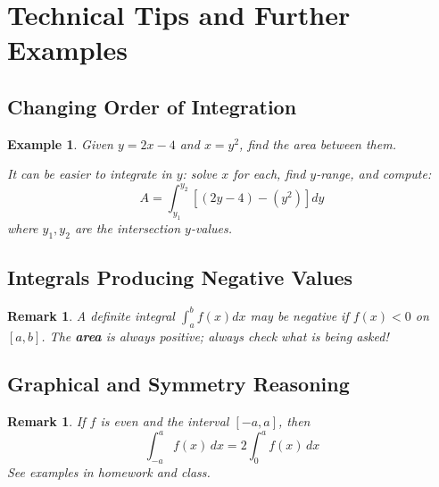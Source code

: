\documentclass[12pt]{article}
\newtheorem{example}[definition]{Example}
\newtheorem{remark}[definition]{Remark}
\begin{document}
\section{Technical Tips and Further Examples}

\subsection{Changing Order of Integration}

\begin{example}
Given $y = 2x-4$ and $x = y^2$, find the area between them.

It can be easier to integrate in $y$: solve $x$ for each, find $y$-range, and compute:
\[
A = \int_{y_1}^{y_2} \left[ (2y-4) - (y^2) \right] dy
\]
where $y_1,y_2$ are the intersection $y$-values.
\end{example}

\subsection{Integrals Producing Negative Values}

\begin{remark}
A definite integral $\int_a^b f(x)dx$ may be negative if $f(x)<0$ on $[a,b]$. The \textbf{area} is always positive; always check what is being asked!
\end{remark}

\subsection{Graphical and Symmetry Reasoning}

\begin{remark}
If $f$ is even and the interval $[ -a, a ]$, then
\[
\int_{-a}^a f(x)\,dx = 2\int_0^a f(x)\,dx
\]
See examples in homework and class.
\end{remark}
\end{document}

